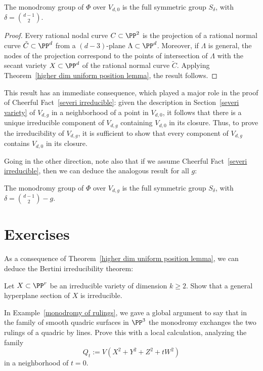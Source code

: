 \begin{proposition}
The monodromy group of $\Phi$ over $V_{d,0}$ is the full symmetric group $S_\delta$, with $\delta = \binom{d-1}{2}$.
\end{proposition}

\begin{proof}
Every rational nodal curve $C \subset \PP^2$ is the projection of a rational normal curve $\tilde C \subset \PP^d$ from a $(d-3)$-plane $\Lambda \subset \PP^d$. Moreover, if $\Lambda$ is general,  the nodes of the projection correspond to the points of intersection of $\Lambda$ with the  secant variety $X \subset \PP^d$ of the rational normal curve $\tilde C$. Applying Theorem~\ref{higher dim uniform position lemma}, the result follows.
\end{proof}

This result has an immediate consequence, which played a major role in the proof of Cheerful Fact~\ref{severi irreducible}: given the description in Section~\ref{severi variety} of $V_{d,g}$ in a neighborhood of a point in $V_{d,0}$, it follows that there is a unique irreducible component of $V_{d,g}$ containing $V_{d,0}$ in its closure. Thus, to prove the irreducibility of $V_{d,g}$, it is sufficient to show that every component of $V_{d,g}$ contains $V_{d,0}$ in its closure. 

Going in the other direction, note also that if we assume Cheerful Fact~\ref{severi irreducible}, then we can deduce the analogous result for all $g$:


\begin{proposition}
The monodromy group of $\Phi$ over $V_{d,g}$ is the full symmetric group $S_\delta$, with $\delta = \binom{d-1}{2} - g$.
\end{proposition}



\section{Exercises}

As a consequence of Theorem~\ref{higher dim uniform position lemma}, we can deduce the Bertini irreducibility theorem:

\begin{exercise}
Let $X \subset \PP^r$ be an irreducible variety of dimension $k \geq 2$. Show that a general hyperplane section of $X$ is irreducible.
\end{exercise}

\begin{exercise}
In Example~\ref{monodromy of rulings}, we gave a global argument to say that in the family of smooth quadric surfaces in $\PP^3$ the monodromy exchanges the two rulings of a quadric by lines. Prove this with a local calculation, analyzing the family
$$
Q_t := V(X^2+Y^2+Z^2 + tW^2)
$$
in a neighborhood of $t=0$.
\end{exercise}

